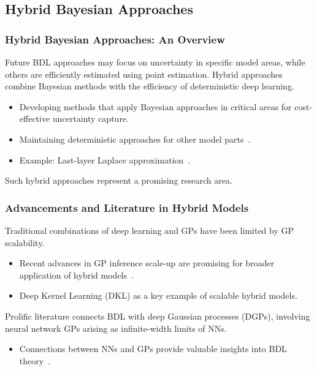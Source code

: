 \documentclass[9pt,handout]{beamer}
\begin{document}
\subsection{Hybrid Bayesian Approaches}

\begin{frame}
\frametitle{Hybrid Bayesian Approaches: An Overview}

Future BDL approaches may focus on uncertainty in specific model areas, while others are efficiently estimated using point estimation. Hybrid approaches combine Bayesian methods with the efficiency of deterministic deep learning.

\begin{itemize}
    \item Developing methods that apply Bayesian approaches in critical areas for cost-effective uncertainty capture.
    \item Maintaining deterministic approaches for other model parts~\citep{daxberger2021a}.
    \item Example: Last-layer Laplace approximation~\citep{daxberger2021b}.
\end{itemize}

Such hybrid approaches represent a promising research area.

\end{frame}

\begin{frame}
\frametitle{Advancements and Literature in Hybrid Models}

Traditional combinations of deep learning and GPs have been limited by GP scalability.

\begin{itemize}
    \item Recent advances in GP inference scale-up are promising for broader application of hybrid models~\citep{wilson2016deep}.
    \item Deep Kernel Learning (DKL) as a key example of scalable hybrid models.
\end{itemize}

Prolific literature connects BDL with deep Gaussian processes (DGPs), involving neural network GPs arising as infinite-width limits of NNs.

\begin{itemize}
    \item Connections between NNs and GPs provide valuable insights into BDL theory~\citep{damianou2013,agrawal2020,neal1996,matthews2018}.
\end{itemize}
\end{frame}
\end{document}

